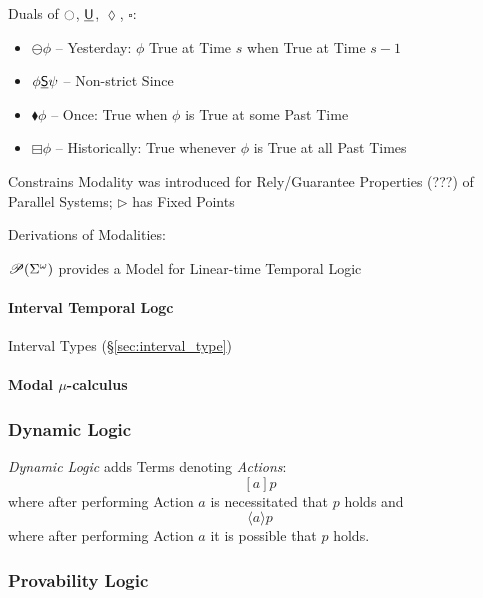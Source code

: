 Duals of $\ocircle$, $\underline{\mathsf{U}}$, $\lozenge$, $\square$:
\begin{itemize}
  \item $\ominus \phi$ -- Yesterday: $\phi$ True at Time $s$ when True
    at Time $s - 1$
  \item $\phi \underline{\mathsf{S}} \psi$ -- Non-strict Since
  \item $\blacklozenge \phi$ -- Once: True when $\phi$ is True at some
    Past Time
  \item $\boxminus \phi$ -- Historically: True whenever $\phi$ is True
    at all Past Times
\end{itemize}

Constrains Modality was introduced for Rely/Guarantee Properties (???)
of Parallel Systems; $\rhd$ has Fixed Points

Derivations of Modalities: %

$\mathscr{P}(\Sigma^\omega)$ provides a Model for Linear-time Temporal Logic
\cite{abramsky-gay-nagarajan96}



\paragraph{Interval Temporal Logc}\label{sec:interval_temporal}\hfill

Interval Types (\S\ref{sec:interval_type})



\paragraph{Modal $\mu$-calculus}\label{sec:modal_mu}\hfill



\subsubsection{Dynamic Logic}\label{sec:dynamic_logic}

\emph{Dynamic Logic} adds Terms denoting \emph{Actions}:
\[
  [a]p
\]
where after performing Action $a$ is necessitated that $p$ holds and
\[
  \langle a \rangle p
\]
where after performing Action $a$ it is possible that $p$ holds.



\subsubsection{Provability Logic}\label{sec:provability_logic}

